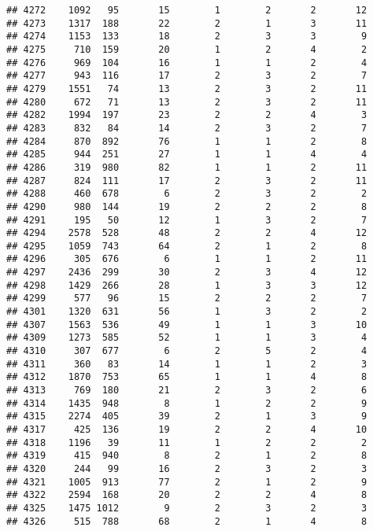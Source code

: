 \documentclass[]{article}
\begin{document}
\begin{verbatim}
## 4272    1092   95       15        1        2       2       12
## 4273    1317  188       22        2        1       3       11
## 4274    1153  133       18        2        3       3        9
## 4275     710  159       20        1        2       4        2
## 4276     969  104       16        1        1       2        4
## 4277     943  116       17        2        3       2        7
## 4279    1551   74       13        2        3       2       11
## 4280     672   71       13        2        3       2       11
## 4282    1994  197       23        2        2       4        3
## 4283     832   84       14        2        3       2        7
## 4284     870  892       76        1        1       2        8
## 4285     944  251       27        1        1       4        4
## 4286     319  980       82        1        1       2       11
## 4287     824  111       17        2        3       2       11
## 4288     460  678        6        2        3       2        2
## 4290     980  144       19        2        2       2        8
## 4291     195   50       12        1        3       2        7
## 4294    2578  528       48        2        2       4       12
## 4295    1059  743       64        2        1       2        8
## 4296     305  676        6        1        1       2       11
## 4297    2436  299       30        2        3       4       12
## 4298    1429  266       28        1        3       3       12
## 4299     577   96       15        2        2       2        7
## 4301    1320  631       56        1        3       2        2
## 4307    1563  536       49        1        1       3       10
## 4309    1273  585       52        1        1       3        4
## 4310     307  677        6        2        5       2        4
## 4311     360   83       14        1        1       2        3
## 4312    1870  753       65        1        1       4        8
## 4313     769  180       21        2        3       2        6
## 4314    1435  948        8        1        2       2        9
## 4315    2274  405       39        2        1       3        9
## 4317     425  136       19        2        2       4       10
## 4318    1196   39       11        1        2       2        2
## 4319     415  940        8        2        1       2        8
## 4320     244   99       16        2        3       2        3
## 4321    1005  913       77        2        1       2        9
## 4322    2594  168       20        2        2       4        8
## 4325    1475 1012        9        2        3       2        3
## 4326     515  788       68        2        1       4        8

\end{verbatim}
\end{document}
